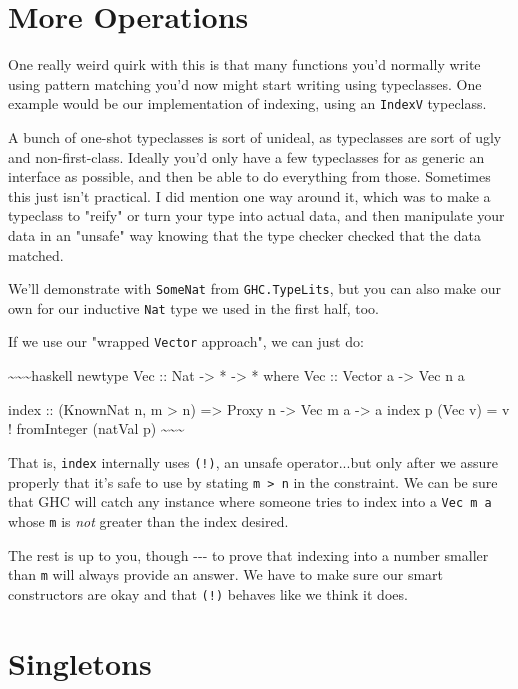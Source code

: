 \documentclass[]{article}
\begin{document}
\section{More Operations}

One really weird quirk with this is that many functions you'd normally write
using pattern matching you'd now might start writing using typeclasses. One
example would be our implementation of indexing, using an \texttt{IndexV}
typeclass.

A bunch of one-shot typeclasses is sort of unideal, as typeclasses are sort of
ugly and non-first-class. Ideally you'd only have a few typeclasses for as
generic an interface as possible, and then be able to do everything from those.
Sometimes this just isn't practical. I did mention one way around it, which was
to make a typeclass to "reify" or turn your type into actual data, and then
manipulate your data in an "unsafe" way knowing that the type checker checked
that the data matched.

We'll demonstrate with \texttt{SomeNat} from \texttt{GHC.TypeLits}, but you can
also make our own for our inductive \texttt{Nat} type we used in the first half,
too.

If we use our "wrapped \texttt{Vector} approach", we can just do:

\textasciitilde{}\textasciitilde{}\textasciitilde{}haskell newtype Vec :: Nat
-\textgreater{} * -\textgreater{} * where Vec :: Vector a -\textgreater{} Vec n
a

index :: (KnownNat n, m \textgreater{} n) =\textgreater{} Proxy n
-\textgreater{} Vec m a -\textgreater{} a index p (Vec v) = v ! fromInteger
(natVal p) \textasciitilde{}\textasciitilde{}\textasciitilde{}

That is, \texttt{index} internally uses \texttt{(!)}, an unsafe operator...but
only after we assure properly that it's safe to use by stating
\texttt{m\ \textgreater{}\ n} in the constraint. We can be sure that GHC will
catch any instance where someone tries to index into a \texttt{Vec\ m\ a} whose
\texttt{m} is \emph{not} greater than the index desired.

The rest is up to you, though -\/-\/- to prove that indexing into a number
smaller than \texttt{m} will always provide an answer. We have to make sure our
smart constructors are okay and that \texttt{(!)} behaves like we think it does.

\section{Singletons}
\end{document}
